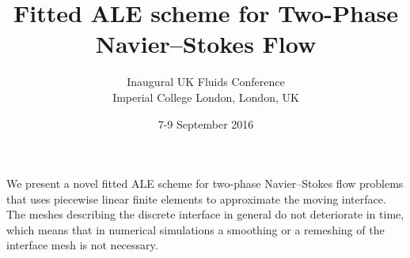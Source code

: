 \documentclass{article}
\begin{document}
\title{Fitted ALE scheme for Two-Phase Navier--Stokes Flow}
\date{7-9 September 2016}
\author{Inaugural UK Fluids Conference\\
Imperial College London, London, UK}

\maketitle

We present a novel fitted ALE scheme for two-phase Navier--Stokes flow problems
that uses piecewise linear finite elements to approximate the moving interface.
The meshes describing the discrete interface in general do not deteriorate in
time, which means that in numerical simulations a smoothing or a remeshing of
the interface mesh is not necessary.
\end{document}
